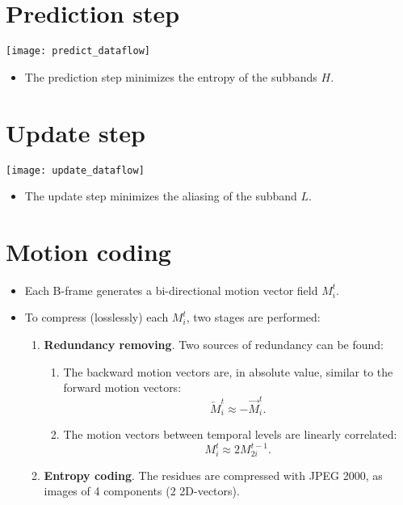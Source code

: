 \section{Prediction step}
\vspace{-2ex}
\begin{center}
\texttt{[image: predict\_dataflow]}
\end{center}
\vspace{-2ex}
\begin{itemize}
\item The prediction step minimizes the entropy of the subbands $H$.
\end{itemize}

\section{Update step}
\begin{center}
\texttt{[image: update\_dataflow]}
\end{center}
\begin{itemize}
\item The update step minimizes the aliasing of the subband $L$.
\end{itemize}

\section{Motion coding}
\begin{itemize}
\item Each B-frame generates a bi-directional motion vector field $M^t_i$.
\item To compress (losslessly) each $M^t_i$, two stages are performed:
  \begin{enumerate}
  \item \textbf{Redundancy removing}. Two sources of redundancy can be
    found:
    \begin{enumerate}
    \item The backward motion vectors are, in absolute value, similar
      to the forward motion vectors:
      \begin{equation}
        \overleftarrow M^t_i \approx -\overrightarrow M^t_i.
        \label{eq:motion_pred_1}
      \end{equation}
    \item The motion vectors between temporal levels are linearly
      correlated:
      \begin{equation}
        M^t_i \approx 2 M^{t-1}_{2i}.
        \label{eq:motion_pred_2}
      \end{equation}
    \end{enumerate}
  \item \textbf{Entropy coding}. The residues are compressed with JPEG
    2000, as images of 4 components (2 2D-vectors).
  \end{enumerate}
\end{itemize}

